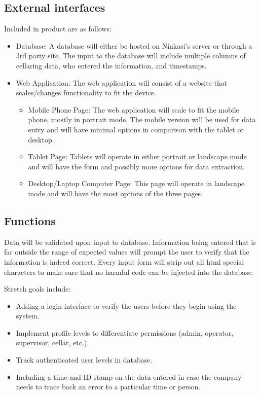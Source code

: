 \documentclass[draftclsnofoot,onecolumn,letterpaper,10pt,compsoc]{IEEEtran}
\begin{document}
	\subsection{External interfaces}
    Included in product are as follows:
        \begin{itemize}
				\item{Database: A database will either be hosted on Ninkasi's server or through a 3rd party site.
                The input to the database will include multiple columns of cellaring data, who entered the information, and timestamps. }

            \item{Web Application:}
            The web application will consist of a website that scales/changes functionality to fit the device.

                \begin{itemize}
				    \item{Mobile Phone Page: The web application will scale to fit the mobile phone, mostly in portrait mode.
					The mobile version will be used for data entry and will have minimal options in comparison with the tablet or desktop.}

                    \item{Tablet Page: Tablets will operate in either portrait or landscape mode and will have the form and possibly more options for data extraction.}

                    \item{Desktop/Laptop Computer Page: This page will operate in landscape mode and will have the most options of the three pages.}

                \end{itemize}
        \end{itemize}

	\subsection{Functions}

		Data will be validated upon input to database.
		Information being entered that is far outside the range of expected values will prompt the user to verify that the information is indeed correct.
		Every input form will strip out all html special characters to make sure that no harmful code can be injected into the database.

		Stretch goals include:
		\begin{itemize}
			\item{Adding a login interface to verify the users before they begin using the system.}

            \item{Implement profile levels to differentiate permissions (admin, operator, supervisor, cellar, etc.).}

            \item{Track authenticated user levels in database.}

			\item{Including a time and ID stamp on the data entered in case the company needs to trace back an error to a particular time or person.}
		\end{itemize}
\end{document}
